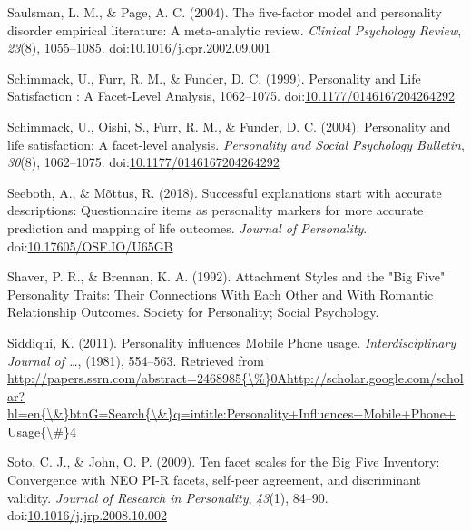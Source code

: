 \documentclass[,man,floatsintext]{apa6}
\theoremstyle{definition}
\theoremstyle{definition}
\theoremstyle{definition}
\theoremstyle{remark}
\begin{document}
\leavevmode\hypertarget{ref-SaulsmanPage2004}{}%
Saulsman, L. M., \& Page, A. C. (2004). The five-factor model and
personality disorder empirical literature: A meta-analytic review.
\emph{Clinical Psychology Review}, \emph{23}(8), 1055--1085.
doi:\href{https://doi.org/10.1016/j.cpr.2002.09.001}{10.1016/j.cpr.2002.09.001}

\leavevmode\hypertarget{ref-Schimmack1999}{}%
Schimmack, U., Furr, R. M., \& Funder, D. C. (1999). Personality and
Life Satisfaction : A Facet-Level Analysis, 1062--1075.
doi:\href{https://doi.org/10.1177/0146167204264292}{10.1177/0146167204264292}

\leavevmode\hypertarget{ref-Schimmack2004}{}%
Schimmack, U., Oishi, S., Furr, R. M., \& Funder, D. C. (2004).
Personality and life satisfaction: A facet-level analysis.
\emph{Personality and Social Psychology Bulletin}, \emph{30}(8),
1062--1075.
doi:\href{https://doi.org/10.1177/0146167204264292}{10.1177/0146167204264292}

\leavevmode\hypertarget{ref-Seeboth2018}{}%
Seeboth, A., \& Mõttus, R. (2018). Successful explanations start with
accurate descriptions: Questionnaire items as personality markers for
more accurate prediction and mapping of life outcomes. \emph{Journal of
Personality}.
doi:\href{https://doi.org/10.17605/OSF.IO/U65GB}{10.17605/OSF.IO/U65GB}

\leavevmode\hypertarget{ref-Shaver1992}{}%
Shaver, P. R., \& Brennan, K. A. (1992). Attachment Styles and the "Big
Five" Personality Traits: Their Connections With Each Other and With
Romantic Relationship Outcomes. Society for Personality; Social
Psychology.

\leavevmode\hypertarget{ref-Siddiqui2011}{}%
Siddiqui, K. (2011). Personality influences Mobile Phone usage.
\emph{Interdisciplinary Journal of \ldots{}}, (1981), 554--563.
Retrieved from
\href{http://papers.ssrn.com/abstract=2468985\%7B/\%\%7D0Ahttp://scholar.google.com/scholar?hl=en\%7B/\&\%7DbtnG=Search\%7B/\&\%7Dq=intitle:Personality+Influences+Mobile+Phone+Usage\%7B/\#\%7D4}{http://papers.ssrn.com/abstract=2468985\{\textbackslash{}\%\}0Ahttp://scholar.google.com/scholar?hl=en\{\textbackslash{}\&\}btnG=Search\{\textbackslash{}\&\}q=intitle:Personality+Influences+Mobile+Phone+Usage\{\textbackslash{}\#\}4}

\leavevmode\hypertarget{ref-SotoJohn2009}{}%
Soto, C. J., \& John, O. P. (2009). Ten facet scales for the Big Five
Inventory: Convergence with NEO PI-R facets, self-peer agreement, and
discriminant validity. \emph{Journal of Research in Personality},
\emph{43}(1), 84--90.
doi:\href{https://doi.org/10.1016/j.jrp.2008.10.002}{10.1016/j.jrp.2008.10.002}
\end{document}

